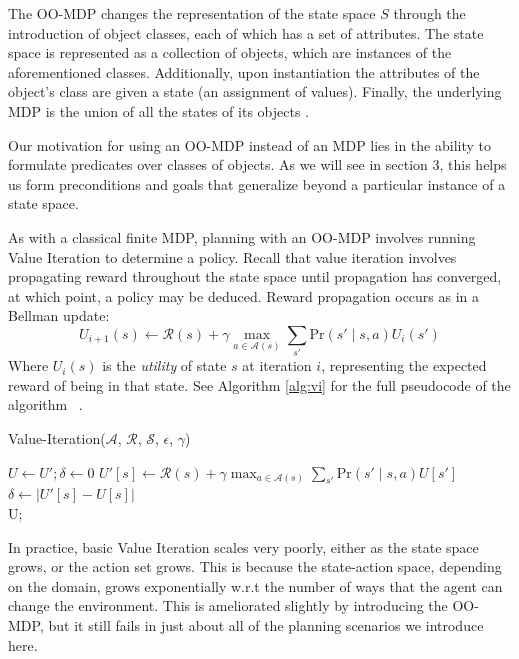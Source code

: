\documentclass[]{article}
\begin{document}
The OO-MDP changes the representation of the state space 
$S$ through the introduction of object classes, each of which 
has a set of attributes. The state space is represented as a 
collection of objects, which are instances of the aforementioned 
classes. Additionally, upon instantiation the attributes of the 
object's class are given a state (an assignment of values). 
Finally, the underlying MDP is the union of all the states of its 
objects \citep{diuk08}.

Our motivation for using an OO-MDP instead of an MDP
lies in the ability to formulate predicates over classes of 
objects. As we will see in section 3, this helps us form 
preconditions and goals that generalize beyond a particular
instance of a state space.

As with a classical finite MDP, planning with an OO-MDP 
involves running Value Iteration to determine a policy. 
Recall that value iteration involves propagating reward 
throughout the state space until propagation has converged, 
at which point, a policy may be deduced. Reward propagation
occurs as in a Bellman update:
\begin{equation}
U_{i+1}(s) \leftarrow \mathcal{R}(s) + \gamma \max_{a \in \mathcal{A}(s)} \sum_{s'} \text{Pr}(s' \mid s, a)U_i(s')
\end{equation}
Where $U_i(s)$ is the {\it utility} of state $s$ at iteration $i$, 
representing the expected reward of being in that state. See Algorithm \ref{alg:vi} for the full pseudocode of the algorithm ~\citep{russellnorvigAI}.

\begin{algorithm}
  \caption{Value-Iteration($\mathcal{A}$, $\mathcal{R}$, $\mathcal{S}$, $\epsilon$, $\gamma$)}
  \begin{algorithmic}[1]
    \State $U \gets U';\delta \gets 0$
    \State $U'[s] \leftarrow \mathcal{R}(s) + \gamma \max_{a \in \mathcal{A}(s)} \sum_{s'} \text{Pr}(s'\mid s,a) U[s']$
    	\State $\delta \gets |U'[s] - U[s]|$ 
    \EndIf
    \EndFor
    \EndWhile \\
    \Return U;
  \end{algorithmic}
  \label{alg:vi}
\end{algorithm}


In practice, basic Value Iteration scales very poorly, either as the state 
space grows, or the action set grows. This is because the state-action 
space, depending on the domain, grows exponentially w.r.t the number 
of ways that the agent can change the environment. This is ameliorated 
slightly by introducing the OO-MDP, but it still fails in just about all of 
the planning scenarios we introduce here.
\end{document}
